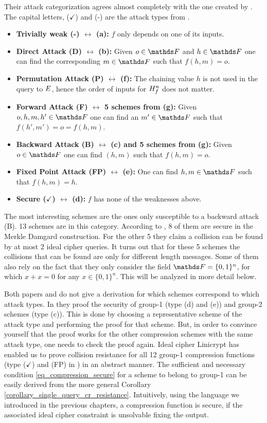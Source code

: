 Their attack categorization agrees almost completely with the one created by \cite{C:PreGovVan93}.
The capital letters, ($\checkmark$) and (-) are the attack types from \cite{C:PreGovVan93}.
\begin{itemize}
\item \textbf{Trivially weak (-) $\leftrightarrow$ (a):} $f$ only depends on one of its inputs.
\item \textbf{Direct Attack (D) $\leftrightarrow$ (b):} Given $o \in \F$ and $h \in \F$ one can find the corresponding $m \in \F$ such that $f(h,m) = o$.
\item \textbf{Permutation Attack (P) $\leftrightarrow$ (f):} The chaining value $h$ is not used in the query to $E$,
        hence the order of inputs for $H^n_f$ does not matter.
\item \textbf{Forward Attack (F) $\leftrightarrow$ 5 schemes from (g):} Given $o, h, m, h' \in \F$ one can find an $m' \in \F$ such that $f(h',m') = o = f(h, m)$.
\item \textbf{Backward Attack (B) $\leftrightarrow$ (c) and 5 schemes from (g):} Given $o \in \F$ one can find $(h,m)$ such that $f(h,m) = o$.
\item \textbf{Fixed Point Attack (FP) $\leftrightarrow$ (e):} One can find $h,m \in \F$ such that $f(h,m) = h$.
\item \textbf{Secure ($\checkmark$) $\leftrightarrow$ (d):} $f$ has none of the weaknesses above.
\end{itemize}
The most interesting schemes are the ones only susceptible to a backward attack (B).
13 schemes are in this category.
According to \cite{C:BlaRogShr02}, 8 of them are secure in the Merkle Damgard construction.
For the other 5 they claim a collision can be found by at most 2 ideal cipher queries.
It turns out that for these 5 schemes the collisions that can be found are only for different length messages.
Some of them also rely on the fact that they only consider the field $\F = \{0,1\}^n$, for which $x + x = 0$ for any $x \in \{0,1\}^n$.
This will be analyzed in more detail below.

Both papers \cite{C:PreGovVan93} and \cite{C:BlaRogShr02} do not give a derivation for which schemes correspond to which attack types.
In \cite{C:BlaRogShr02} they proof the security of group-1 (type (d) and (e)) and group-2 schemes (type (c)).
This is done by choosing a representative scheme of the attack type and performing the proof for that scheme.
But, in order to convince yourself that the proof works for the other compression schemes with the same attack type,
one needs to check the proof again.
Ideal cipher Linicrypt has enabled us to prove collision resistance for all 12 group-1 compression functions (type ($\checkmark$) and (FP) in \cite{C:PreGovVan93}) in an abstract manner.
The sufficient and necessary condition \eqref{eq_compression_secure} for a scheme to belong to group-1
can be easily derived from the more general Corollary \ref{corollary_single_query_cr_resistance}.
Intuitively, using the language we introduced in the previous chapters,
a compression function is secure, if the associated ideal cipher constraint is unsolvable fixing the output.

